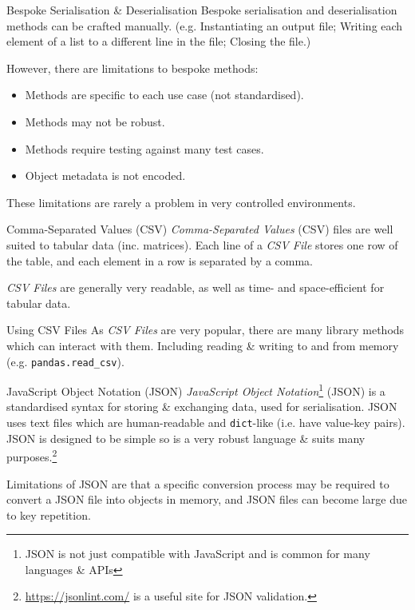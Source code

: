 \documentclass[11pt,a4paper]{article}
\begin{document}
  \begin{remark}{Bespoke Serialisation \& Deserialisation}
    Bespoke serialisation and deserialisation methods can be crafted manually. (e.g. Instantiating an output file; Writing each element of a list to a different line in the file; Closing the file.)
    \par However, there are limitations to bespoke methods:
    \begin{itemize}
      \item Methods are specific to each use case (not standardised).
      \item Methods may not be robust.
      \item Methods require testing against many test cases.
      \item Object metadata is not encoded.
    \end{itemize}
    These limitations are rarely a problem in very controlled environments.
  \end{remark}

  \begin{definition}{Comma-Separated Values (CSV)}
    \textit{Comma-Separated Values} (CSV) files are well suited to tabular data (inc. matrices). Each line of a \textit{CSV File} stores one row of the table, and each element in a row is separated by a comma.
    \par \textit{CSV Files} are generally very readable, as well as time- and space-efficient for tabular data.
  \end{definition}

  \begin{remark}{Using CSV Files}
    As \textit{CSV Files} are very popular, there are many library methods which can interact with them. Including reading \& writing to and from memory (e.g. \texttt{pandas.read\_csv}).
  \end{remark}

  \begin{definition}{JavaScript Object Notation (JSON)}
    \textit{JavaScript Object Notation}\footnote{JSON is not just compatible with JavaScript and is common for many languages \& APIs} (JSON) is a standardised syntax for storing \& exchanging data, used for serialisation. JSON uses text files which are human-readable and \texttt{dict}-like (i.e. have value-key pairs). JSON is designed to be simple so is a very robust language \& suits many purposes.\footnote{\url{https://jsonlint.com/} is a useful site for JSON validation.}
    \par Limitations of JSON are that a specific conversion process may be required to convert a JSON file into objects in memory, and JSON files can become large due to key repetition.
  \end{definition}
\end{document}
